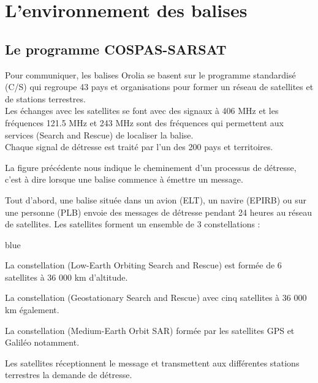 \chapter{L'environnement des balises}  

\section{Le programme COSPAS-SARSAT}

Pour communiquer, les balises Orolia se basent sur le programme standardisé  (C/S)  qui regroupe 43 pays et organisations pour former un réseau de satellites et de stations terrestres. \\ Les échanges avec les satellites se font avec des signaux à 406 MHz et les fréquences 121.5 MHz et 243 MHz sont des fréquences qui permettent aux services 
(Search and Rescue) de localiser la balise.\\

Chaque signal de détresse est traité par l'un des 200 pays et territoires.



La figure précédente nous indique le cheminement d'un processus de détresse, c'est à dire lorsque une balise commence à émettre un message.

Tout d'abord, une balise située dans un avion (ELT), un navire (EPIRB) ou sur une personne (PLB) envoie des messages de détresse pendant 24 heures au réseau de satellites. 
Les satellites forment un ensemble de 3 constellations : 


\begin{items}{blue}{\Circle}
    \item La constellation  (Low-Earth Orbiting Search and Rescue) est formée de 6 satellites à 36 000 km d'altitude.
    \item La constellation  (Geostationary Search and Rescue) avec cinq satellites à 36 000 km également.
    \item La constellation  (Medium-Earth Orbit SAR) formée par les satellites GPS et Galiléo notamment.
\end{items}

Les satellites réceptionnent le message et transmettent aux différentes stations terrestres la demande de détresse.\\

